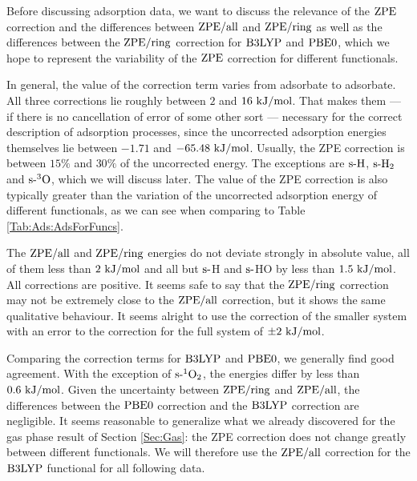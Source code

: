 
Before discussing adsorption data, we want to discuss the relevance of the
$\text{ZPE}$ correction and the differences between $\text{ZPE}/\text{all}$ and $\text{ZPE}/\text{ring}$
as well as the differences between the $\text{ZPE}/\text{ring}$ correction for $\text{B3LYP}$ and
$\text{PBE0}$, which we hope to represent the variability of the
$\text{ZPE}$ correction for different functionals.

In general, the value of the correction term varies from
adsorbate to adsorbate. All three corrections lie roughly between $2$
and $16~\text {kJ/mol}$. That makes them --- if there is no cancellation
of error of some other sort --- necessary for the correct description
of adsorption processes, since the uncorrected adsorption energies
themselves lie between $-1.71$ and $-65.48~\text {kJ/mol}$. Usually, the ZPE correction
is between $15\%$ and $30\%$ of the uncorrected energy. The exceptions are
$\text{s-}{\text H}$, $\text{s-}{\ensuremath{\text H_2}}$ and $\text{s-}{\ensuremath{{^3\text{O}}}}$, which we will discuss later. The
value of the ZPE correction is also typically greater than the variation of the
uncorrected adsorption energy of different functionals, as we can see when
comparing to Table \ref{Tab:Ads:AdsForFuncs}.

The $\text{ZPE}/\text{all}$ and $\text{ZPE}/\text{ring}$ energies
do not deviate strongly in absolute value, all of them less than $2~\text {kJ/mol}$
and all but $\text{s-}$H and $\text{s-}$HO by less than $1.5~\text {kJ/mol}$. All corrections are
positive.
It seems safe to say that the $\text{ZPE}/\text{ring}$ correction may not be extremely
close to the $\text{ZPE}/\text{all}$ correction, but it shows the same qualitative
behaviour. 
It seems alright to use the correction of the smaller system with an error to
the correction for the full system of $\pm 2~\text {kJ/mol}$.

Comparing the correction terms for $\text{B3LYP}$ and $\text{PBE0}$, we generally find
good agreement. With the exception of $\text{s-}{^1\ensuremath{\text O_2}}$, the energies
differ by less than $0.6~\text {kJ/mol}$.
Given the uncertainty between $\text{ZPE}/\text{ring}$ and $\text{ZPE}/\text{all}$, the differences
between the  $\text{PBE0}$ correction and the $\text{B3LYP}$ correction are negligible.
It seems reasonable to generalize what we already discovered for the gas
phase result of Section \ref{Sec:Gas}: the ZPE correction does
not change greatly between different functionals. We will therefore
use the $\text{ZPE}/\text{all}$ correction for the $\text{B3LYP}$ functional for all
following data.

